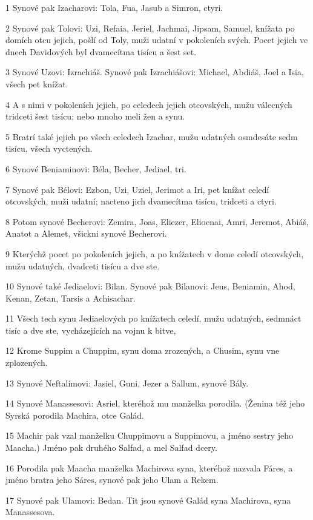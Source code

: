 \par 1 Synové pak Izacharovi: Tola, Fua, Jasub a Simron, ctyri.
\par 2 Synové pak Tolovi: Uzi, Refaia, Jeriel, Jachmai, Jipsam, Samuel, knížata po domích otcu jejich, pošlí od Toly, muži udatní v pokoleních svých. Pocet jejich ve dnech Davidových byl dvamecítma tisícu a šest set.
\par 3 Synové Uzovi: Izrachiáš. Synové pak Izrachiášovi: Michael, Abdiáš, Joel a Isia, všech pet knížat.
\par 4 A s nimi v pokoleních jejich, po celedech jejich otcovských, mužu válecných tridceti šest tisícu; nebo mnoho meli žen a synu.
\par 5 Bratrí také jejich po všech celedech Izachar, mužu udatných osmdesáte sedm tisícu, všech vyctených.
\par 6 Synové Beniaminovi: Béla, Becher, Jediael, tri.
\par 7 Synové pak Bélovi: Ezbon, Uzi, Uziel, Jerimot a Iri, pet knížat celedí otcovských, muži udatní; nacteno jich dvamecítma tisícu, tridceti a ctyri.
\par 8 Potom synové Becherovi: Zemira, Joas, Eliezer, Elioenai, Amri, Jeremot, Abiáš, Anatot a Alemet, všickni synové Becherovi.
\par 9 Kterýchž pocet po pokoleních jejich, a po knížatech v dome celedí otcovských, mužu udatných, dvadceti tisícu a dve ste.
\par 10 Synové také Jediaelovi: Bilan. Synové pak Bilanovi: Jeus, Beniamin, Ahod, Kenan, Zetan, Tarsis a Achisachar.
\par 11 Všech tech synu Jediaelových po knížatech celedí, mužu udatných, sedmnáct tisíc a dve ste, vycházejících na vojnu k bitve,
\par 12 Krome Suppim a Chuppim, synu doma zrozených, a Chusim, synu vne zplozených.
\par 13 Synové Neftalímovi: Jasiel, Guni, Jezer a Sallum, synové Bály.
\par 14 Synové Manassesovi: Asriel, kteréhož mu manželka porodila. (Ženina též jeho Syrská porodila Machira, otce Galád.
\par 15 Machir pak vzal manželku Chuppimovu a Suppimovu, a jméno sestry jeho Maacha.) Jméno pak druhého Salfad, a mel Salfad dcery.
\par 16 Porodila pak Maacha manželka Machirova syna, kteréhož nazvala Fáres, a jméno bratra jeho Sáres, synové pak jeho Ulam a Rekem.
\par 17 Synové pak Ulamovi: Bedan. Tit jsou synové Galád syna Machirova, syna Manassesova.
